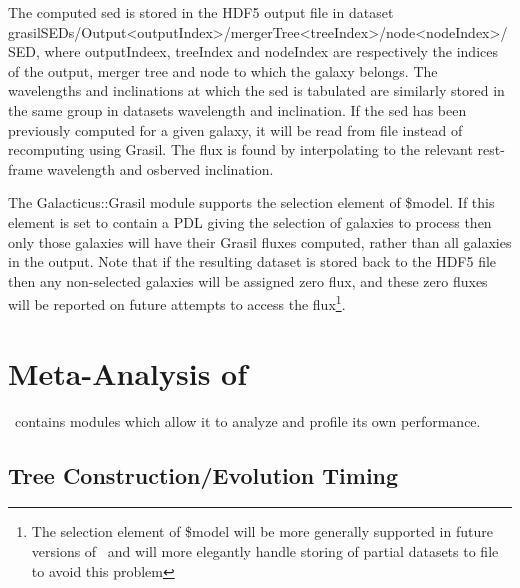 The computed \gls{sed} is stored in the HDF5 output file in dataset {\normalfont \ttfamily grasilSEDs/Output\textless outputIndex\textgreater/mergerTree\textless treeIndex\textgreater/node\textless nodeIndex\textgreater/SED}, where {\normalfont \ttfamily outputIndeex}, {\normalfont \ttfamily treeIndex} and {\normalfont \ttfamily nodeIndex} are respectively the indices of the output, merger tree and node to which the galaxy belongs. The wavelengths and inclinations at which the \gls{sed} is tabulated are similarly stored in the same group in datasets {\normalfont \ttfamily wavelength} and {\normalfont \ttfamily inclination}. If the \gls{sed} has been previously computed for a given galaxy, it will be read from file instead of recomputing using {\normalfont \ttfamily Grasil}. The flux is found by interpolating to the relevant rest-frame wavelength and osberved inclination.

The {\normalfont \ttfamily Galacticus::Grasil} module supports the {\normalfont \ttfamily selection} element of {\normalfont \ttfamily \$model}. If this element is set to contain a PDL giving the selection of galaxies to process then only those galaxies will have their {\normalfont \ttfamily Grasil} fluxes computed, rather than all galaxies in the output. Note that if the resulting dataset is stored back to the HDF5 file then any non-selected galaxies will be assigned zero flux, and these zero fluxes will be reported on future attempts to access the flux\footnote{The {\normalfont \ttfamily selection} element of {\normalfont \ttfamily \$model} will be more generally supported in future versions of \protect\glc\ and will more elegantly handle storing of partial datasets to file to avoid this problem}.

\section{Meta-Analysis of \glc}

\glc\ contains modules which allow it to analyze and profile its own performance.

\subsection{Tree Construction/Evolution Timing}\label{sec:MetaTreeTimingProfiler}

